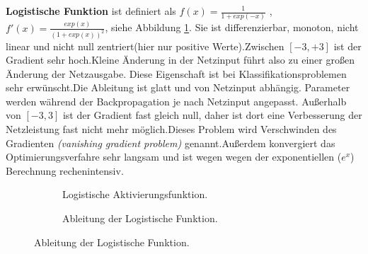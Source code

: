 \documentclass[12pt,a4paper]{scrartcl}
\numberwithin{equation}{section}
\begin{document}
\textbf{Logistische Funktion} ist definiert als $f(x)=\frac{1}{1+exp(-x)} $ ,$ f'(x)= \frac{exp(x)}{(1+exp(x))^2}$, siehe Abbildung \ref{fig:sigmoid}. Sie ist differenzierbar, monoton, nicht linear und nicht null zentriert(hier nur positive Werte).Zwischen $ [-3,+3] $ ist der Gradient sehr hoch.Kleine Änderung in der Netzinput führt also zu einer großen Änderung der Netzausgabe. Diese Eigenschaft ist bei Klassifikationsproblemen sehr erwünscht.Die Ableitung ist glatt und von Netzinput abhängig. Parameter werden während der Backpropagation je nach Netzinput angepasst.
Außerhalb von $ [-3,3]  $ ist der Gradient fast gleich null, daher ist dort eine Verbesserung der Netzleistung fast nicht mehr möglich.Dieses Problem wird Verschwinden des Gradienten \textit{(vanishing gradient problem)} genannt.Außerdem konvergiert das Optimierungsverfahre sehr langsam und ist wegen wegen der exponentiellen  ($ e^x $) Berechnung rechenintensiv.
\begin{figure}[h]
	\caption{Logistische Aktivierungsfunktion:$ sigmoid(x) $.}
	\centering
	\begin{subfigure}{.5\textwidth}	
		\centering	
		\caption{Logistische Aktivierungsfunktion.}
		
	\end{subfigure}%
	\begin{subfigure}{.5\textwidth}	
		\centering	
		\caption{Ableitung der Logistische Funktion.}
	\end{subfigure}
	\label{fig:sigmoid}
	
\end{figure}
\end{document}
